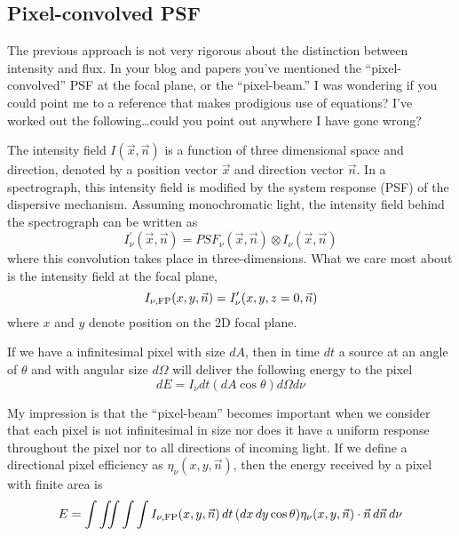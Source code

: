 \documentclass[preprint]{aastex} %
\begin{document}
\subsection{Pixel-convolved PSF}

The previous approach is not very rigorous about the distinction between intensity and flux. In your blog and papers you've mentioned the ``pixel-convolved'' PSF at the focal plane, or the ``pixel-beam.'' I was wondering if you could point me to a reference that makes prodigious use of equations? I've worked out the following\ldots could you point out anywhere I have gone wrong?

The intensity field $I(\vec{x}, \vec{n})$ is a function of three dimensional space and direction, denoted by a position vector $\vec{x}$ and direction vector $\vec{n}$.  In a spectrograph, this intensity field is modified by the system response (PSF) of the dispersive mechanism. Assuming monochromatic light, the intensity field behind the spectrograph can be written as
\begin{equation}
  I^\prime_\nu(\vec{x}, \vec{n}) = PSF_\nu(\vec{x}, \vec{n}) \otimes I_\nu(\vec{x}, \vec{n})
\end{equation}
where this convolution takes place in three-dimensions. What we care most about is the intensity field at the focal plane, 
\begin{equation}
  I_{\nu, {\rm FP}}(x, y, \vec{n}) = I^\prime_\nu(x, y, z=0, \vec{n})
\end{equation}
where $x$ and $y$ denote position on the 2D focal plane.

If we have a infinitesimal pixel with size $dA$, then in time $dt$ a source at an angle of $\theta$ and with angular size $d\Omega$ will deliver the following energy to the pixel
\begin{equation}
  dE = I_\nu dt (dA \cos \theta) d\Omega d\nu
\end{equation}

My impression is that the ``pixel-beam'' becomes important when we consider that each pixel is not infinitesimal in size nor does it have a uniform response throughout the pixel nor to all directions of incoming light. If we define a directional pixel efficiency as $\eta_\nu(x, y, \vec{n})$, then the energy received by a pixel with finite area is
\begin{equation}
  E = \int \iint \int \int I_{\nu, {\rm FP}} (x, y, \vec{n})\, dt\, (dx\,dy \cos \theta) \eta_\nu(x, y, \vec{n}) \cdot \vec{n} \, d\vec{n}\, d\nu
\end{equation}
\end{document}
